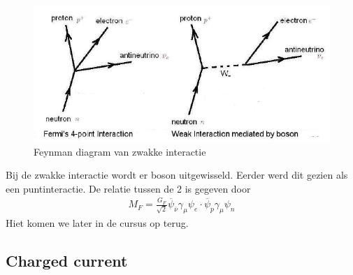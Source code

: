 \documentclass[../main.tex]{subfiles}
\begin{document}
\begin{figure}[h]
    \centering
    \includegraphics[width=0.8\linewidth]{feynman_diagrams_processes_corrections/zwakke_int.png}
    \caption{Feynman diagram van zwakke interactie}%
    \label{fig:zwakke_int}
\end{figure}

Bij de zwakke interactie wordt er boson uitgewisseld. Eerder werd dit gezien als een puntinteractie. De relatie tussen de 2 is gegeven door
\begin{equation}
    \begin{aligned}
        \label{eq:zwakke_int_const}
        M_F = \frac{G_F}{\sqrt{2}} \overline \psi_{\overline\nu}\gamma_\mu\psi_e\cdot \overline\psi_p\gamma_\mu\psi_n
    \end{aligned}
\end{equation}
Hiet komen we later in de cursus op terug.

\subsection{Charged current}%
\label{sub:charged_current}
\end{document}
